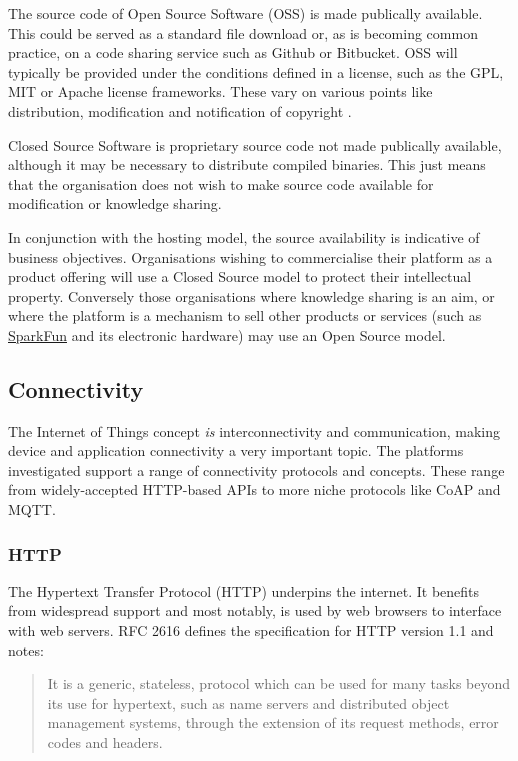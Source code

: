       The source code of Open Source Software (OSS) is made publically available. This could be served as a standard file download or, as is becoming common practice, on a code sharing service such as Github or Bitbucket. OSS will typically be provided under the conditions defined in a license, such as the GPL, MIT or Apache license frameworks. These vary on various points like distribution, modification and notification of copyright \citep{license:2015}.

      Closed Source Software is proprietary source code not made publically available, although it may be necessary to distribute compiled binaries. This just means that the organisation does not wish to make source code available for modification or knowledge sharing. 

      In conjunction with the hosting model, the source availability is indicative of business objectives. Organisations wishing to commercialise their platform as a product offering will use a Closed Source model to protect their intellectual property. Conversely those organisations where knowledge sharing is an aim, or where the platform is a mechanism to sell other products or services (such as \href{https://data.sparkfun.com/}{SparkFun} and its electronic hardware) may use an Open Source model.

    \subsection{Connectivity}
      The Internet of Things concept \emph{is} interconnectivity and communication, making device and application connectivity a very important topic. The platforms investigated support a range of connectivity protocols and concepts. These range from widely-accepted HTTP-based APIs to more niche protocols like CoAP and MQTT.

      \subsubsection{HTTP}
        The Hypertext Transfer Protocol (HTTP) underpins the internet. It benefits from widespread support and most notably, is used by web browsers to interface with web servers. RFC 2616 \citep{rfc2616} defines the specification for HTTP version 1.1 and notes:

          \begin{quote}It is a generic, stateless, protocol which can be used for many tasks beyond its use for hypertext, such as name servers and distributed object management systems, through the extension of its request methods, error codes and headers.\end{quote}

